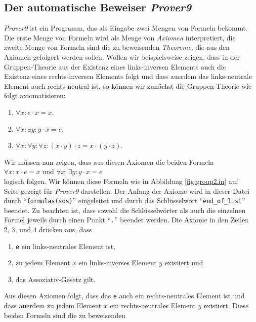 \subsection{Der automatische Beweiser \textsl{Prover9}}
\textsl{Prover9} ist ein Programm, das als Eingabe zwei Mengen von Formeln bekommt.  Die erste Menge von
Formeln wird als Menge von \emph{Axiomen} interpretiert, die zweite Menge von Formeln sind die zu
beweisenden \emph{Theoreme}, die aus den Axiomen gefolgert werden sollen.  Wollen wir beispielsweise zeigen,
dass in der Gruppen-Theorie aus der Existenz eines  links-inversen Elements auch die Existenz eines
rechts-inversen Elements folgt und dass au\3erdem das links-neutrale Element auch rechts-neutral ist,
so k\"{o}nnen wir zun\"{a}chst die Gruppen-Theorie wie folgt axiomatisieren:
\begin{enumerate}
\item $\forall x: e \cdot x = x$,
\item $\forall x: \exists y: y \cdot x = e$,
\item $\forall x: \forall y: \forall z: (x \cdot y) \cdot z = x \cdot (y \cdot z)$.
\end{enumerate}
Wir m\"{u}ssen nun zeigen, dass aus diesen Axiomen die beiden Formeln
\\[0.2cm]
\hspace*{1.3cm}
$\forall x: x \cdot e = x$ \quad und \quad $\forall x: \exists y: y \cdot x = e$ 
\\[0.2cm]
logisch folgen.  Wir k\"{o}nnen diese Formeln wie in Abbildung \ref{fig:group2.in} auf Seite
\pageref{fig:group2.in} gezeigt f\"{u}r \textsl{Prover9} darstellen.
Der Anfang der Axiome wird in dieser Datei durch ``\texttt{formulas(sos)}'' eingeleitet und durch
das Schl\"{u}sselwort ``\texttt{end\_of\_list}'' beendet.  Zu beachten ist, dass sowohl die Schl\"{u}sselw\"{o}rter als
auch die einzelnen Formel jeweils durch einen Punkt ``\texttt{.}'' beendet werden.  Die Axiome in den Zeilen
2, 3, und 4 dr\"{u}cken aus, dass 
\begin{enumerate}
\item \texttt{e} ein links-neutrales Element ist,
\item zu jedem Element $x$ ein links-inverses Element $y$ existiert und
\item das Assoziativ-Gesetz gilt.
\end{enumerate}
Aus diesen Axiomen folgt, dass das \texttt{e} auch ein rechts-neutrales Element ist und dass au\3erdem zu
jedem Element $x$ ein rechts-neutrales Element $y$ existiert.  Diese beiden  Formeln sind die zu beweisenden 
